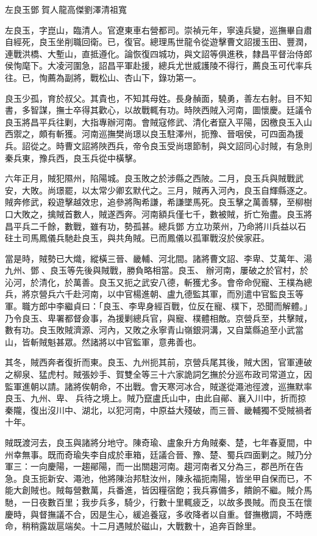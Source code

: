 
\begin{pinyinscope}
左良玉鄧賀人龍高傑劉澤清祖寬

左良玉，字崑山，臨清人。官遼東車右營都司。崇禎元年，寧遠兵變，巡撫畢自肅自經死，良玉坐削職回衛。已，復官。總理馬世龍令從遊擊曹文詔援玉田、豐潤，連戰洪橋、大塹山，直抵遵化。論恢復四城功，與文詔等俱進秩，隸昌平督治侍郎侯恂麾下。大凌河圍急，詔昌平軍赴援，總兵尤世威護陵不得行，薦良玉可代率兵往。已，恂薦為副將，戰松山、杏山下，錄功第一。

良玉少孤，育於叔父。其貴也，不知其母姓。長身赬面，驍勇，善左右射。目不知書，多智謀，撫士卒得其歡心，以故戰輒有功。時陜西賊入河南，圖懷慶。廷議令良玉將昌平兵往剿，大指專辦河南。會賊寇修武、清化者竄入平陽，因檄良玉入山西禦之，頗有斬獲。河南巡撫樊尚璟以良玉駐澤州，扼豫、晉咽侯，可四面為援兵。詔從之。時曹文詔將陜西兵，帝令良玉受尚璟節制，與文詔同心討賊，有急則秦兵東，豫兵西，良玉兵從中橫擊。

六年正月，賊犯隰州，陷陽城。良玉敗之於涉縣之西陂。二月，良玉兵與賊戰武安，大敗。尚璟罷，以太常少卿玄默代之。三月，賊再入河內，良玉自輝縣逐之。賊奔修武，殺遊擊越效忠，追參將陶希謙，希謙墜馬死。良玉擊之萬善驛，至柳樹口大敗之，擒賊首數人，賊遂西奔。河南額兵僅七千，數被賊，折亡殆盡。良玉將昌平兵二千餘，數戰，雖有功，勢孤甚。總兵鄧方立功萊州，乃命將川兵益以石砫土司馬鳳儀兵馳赴良玉，與共角賊。已而鳳儀以孤軍戰沒於侯家莊。

當是時，賊勢已大熾，縱橫三晉、畿輔、河北間。諸將曹文詔、李卑、艾萬年、湯九州、鄧、良玉等先後與賊戰，勝負略相當。良玉、辦河南，屢破之於官村，於沁河，於清化，於萬善。良玉又扼之武安八德，斬獲尤多。會帝命倪寵、王樸為總兵，將京營兵六千赴河南，以中官楊進朝、盧九德監其軍，而別遣中官監良玉等軍。職方郎中李繼貞曰：「良玉、李卑身經百戰，位反在寵、樸下，恐聞而解體。」乃令良玉、卑署都督僉事，為援剿總兵官，與寵、樸體相敵。京營兵至，共擊賊，數有功。良玉敗賊濟源、河內，又敗之永寧青山嶺銀洞溝，又自葉縣追至小武當山，皆斬賊魁甚眾。然諸將以中官監軍，意弗善也。

其冬，賊西奔者復折而東。良玉、九州扼其前，京營兵尾其後，賊大困，官軍連破之柳泉、猛虎村。賊張妙手、賀雙全等三十六家詭詞乞撫於分巡布政司常道立，因監軍進朝以請。諸將俟朝命，不出戰。會天寒河冰合，賊遂從澠池徑渡，巡撫默率良玉、九州、卑、兵待之境上。賊乃竄盧氏山中，由此自鄖、襄入川中，折而掠秦隴，復出沒川中、湖北，以犯河南，中原益大殘破，而三晉、畿輔獨不受賊禍者十年。

賊既渡河去，良玉與諸將分地守。陳奇瑜、盧象升方角賊秦、楚，七年春夏間，中州幸無事。既而奇瑜失李自成於車箱，廷議合晉、豫、楚、蜀兵四面剿之。賊乃分軍三：一向慶陽，一趨鄖陽，而一出關趨河南。趨河南者又分為三，郡邑所在告急。良玉扼新安、澠池，他將陳治邦駐汝州，陳永福扼南陽，皆坐甲自保而已，不能大創賊也。賊每營數萬，兵番進，皆因糧宿飽；我兵寡備多，饋餉不繼。賊介馬馳，一日夜數百里；我步兵多，騎少，行數十里輒疲乏，以故多畏賊。而良玉在懷慶時，與督撫議不合，因是生心，緩追養寇，多收降者以自重。督撫檄調，不時應命，稍稍露跋扈端矣。十二月遇賊於磁山，大戰數十，追奔百餘里。


\end{pinyinscope}
